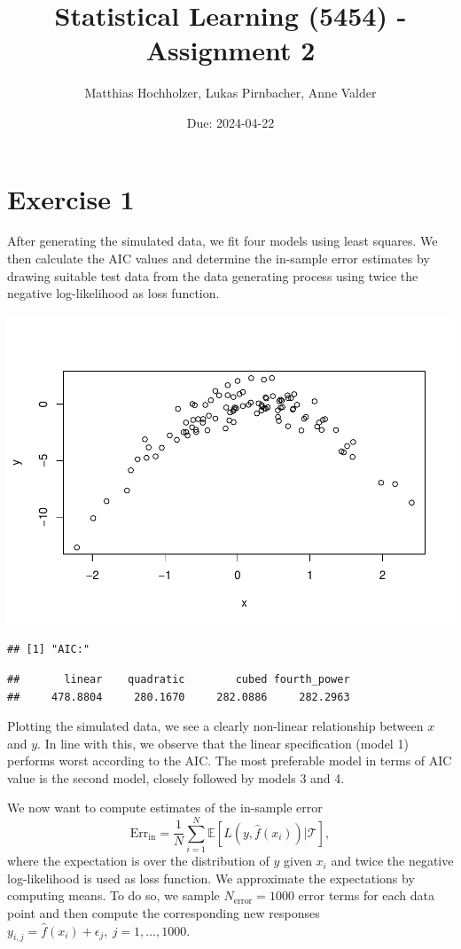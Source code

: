 \documentclass[
]{article}
\title{Statistical Learning (5454) - Assignment 2}
\author{Matthias Hochholzer, Lukas Pirnbacher, Anne Valder}
\date{Due: 2024-04-22}
\begin{document}
\maketitle

\hypertarget{exercise-1}{%
\section{Exercise 1}\label{exercise-1}}

After generating the simulated data, we fit four models using least
squares. We then calculate the AIC values and determine the in-sample
error estimates by drawing suitable test data from the data generating
process using twice the negative log-likelihood as loss function.

\includegraphics{A2_files/figure-latex/unnamed-chunk-3-1.pdf}

\begin{verbatim}
## [1] "AIC:"
\end{verbatim}

\begin{verbatim}
##       linear    quadratic        cubed fourth_power 
##     478.8804     280.1670     282.0886     282.2963
\end{verbatim}

Plotting the simulated data, we see a clearly non-linear relationship
between \(x\) and \(y\). In line with this, we observe that the linear
specification (model 1) performs worst according to the AIC. The most
preferable model in terms of AIC value is the second model, closely
followed by models 3 and 4.

We now want to compute estimates of the in-sample error \[
\text{Err}_{\text{in}} = \frac{1}{N} \sum_{i=1}^N \mathbb{E}\left[ L\left(y,\hat{f}(x_i)\right) \Big| \mathcal{T}\right],
\] where the expectation is over the distribution of \(y\) given \(x_i\)
and twice the negative log-likelihood is used as loss function. We
approximate the expectations by computing means. To do so, we sample
\(N_{\text{error}}=1000\) error terms for each data point and then
compute the corresponding new responses
\(y_{i,j} = \hat{f}(x_i) + \epsilon_j, \ j = 1,\ldots, 1000\).
\end{document}
